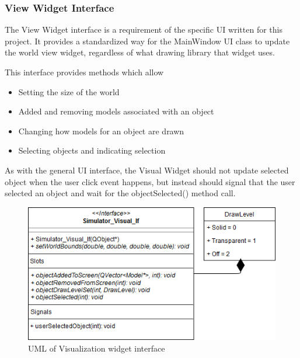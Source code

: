   \subsubsection*{View Widget Interface}
  The View Widget interface is a requirement of the specific UI written for this project. It provides a standardized way for the MainWindow UI class to update the world view widget, regardless of what drawing library that widget uses.
  
  This interface provides methods which allow
  \begin{itemize}
  	\item Setting the size of the world
  	\item Added and removing models associated with an object
  	\item Changing how models for an object are drawn
  	\item Selecting objects and indicating selection
  \end{itemize}
  
  As with the general UI interface, the Visual Widget should not update selected object when the user click event happens, but instead should signal that the user selected an object and wait for the objectSelected() method call.
 \begin{figure}[h]
 	\begin{center}
 	\includegraphics[scale=0.5]{./images_design/uml/Visual_If}
 	\caption{UML of Visualization widget interface\label{uml:visual_if}}
 	\end{center}
 \end{figure}
